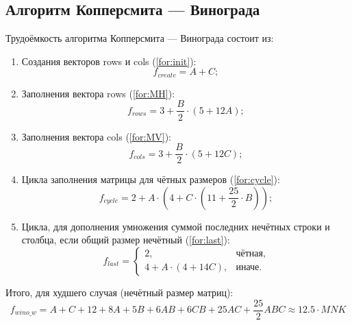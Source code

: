 \subsection{Алгоритм Копперсмита — Винограда}

Трудоёмкость алгоритма Копперсмита — Винограда состоит из:

\begin{enumerate}
	\item Создания векторов rows и cols (\ref{for:init}):
	\begin{equation}
		\label{for:init}
		f_{create} = A + C;
	\end{equation}
	
	\item Заполнения вектора rows (\ref{for:MH}):
	\begin{equation}
		\label{for:MH}
		f_{rows} = 3 + \frac{B}{2} \cdot (5 + 12A);
	\end{equation}
	
	\item Заполнения вектора cols (\ref{for:MV}):
	\begin{equation}
		\label{for:MV}
		f_{cols} = 3 + \frac{B}{2} \cdot (5 + 12C);
	\end{equation}
	
	\item Цикла заполнения матрицы для чётных размеров (\ref{for:cycle}):
	\begin{equation}
		\label{for:cycle}
		f_{cycle} = 2 + A \cdot (4 + C \cdot (11 + \frac{25}{2} \cdot B));
	\end{equation}
	
	\item Цикла, для дополнения умножения суммой последних нечётных строки и столбца, если общий размер нечётный (\ref{for:last}):
	\begin{equation}
		\label{for:last}
		f_{last} = \begin{cases}
			2, & \text{чётная,}\\
			4 + A \cdot (4 + 14C), & \text{иначе.}
		\end{cases}
	\end{equation}
\end{enumerate}

Итого, для худшего случая (нечётный размер матриц): 
\begin{equation}
	\label{for:bad}
	f_{wino\_w} = A + C + 12 + 8A + 5B + 6AB + 6CB + 25AC + \frac{25}{2}ABC \approx 12.5 \cdot MNK
\end{equation}

